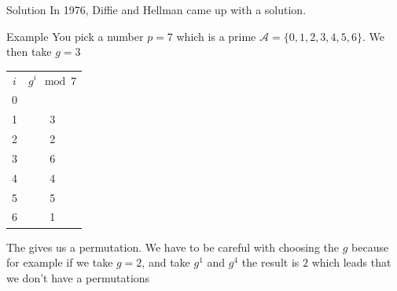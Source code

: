 \begin{parag}{Solution}
    In 1976, Diffie and Hellman came up with a solution.
    \begin{subparag}{Example}
        You pick a number $p = 7$ which is a prime $ \mathcal{A} = \{0, 1,2 , 3, 4, 5, 6\}$. We then take $ g = 3$
        \begin{center}
           
        \begin{tabular}{cc}
            $i$ & $g^i \mod 7$ \\
            0  & \\
            1 & 3 \\
            2 & 2\\
            3 & 6\\
            4 & 4\\
            5 & 5\\
            6 & 1
        \end{tabular}
        \end{center}
        The gives us a permutation. We have to be careful with choosing the $g$ because for example if we take $g = 2$, and take $g^1$ and $g^4$ the result is $2$ which leads that we don't have a permutations
        

\end{subparag}
\end{parag}
